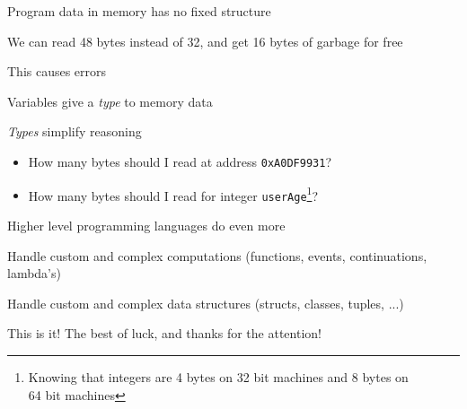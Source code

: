 \documentclass{beamer}
\begin{document}
\begin{slide}{
\item Program data in memory has no fixed structure
\item We can read 48 bytes instead of 32, and get 16 bytes of garbage for free
\item This causes errors
}\end{slide}

\begin{slide}{
\item Variables give a \textit{type} to memory data
\item \textit{Types} simplify reasoning
\pause
\begin{itemize}
\item How many bytes should I read at address \texttt{0xA0DF9931}?
\pause
\item How many bytes should I read for integer \texttt{userAge}\footnote{Knowing that integers are 4 bytes on 32 bit machines and 8 bytes on \\ 64 bit machines}?
\end{itemize}
}\end{slide}

\begin{slide}{
\item Higher level programming languages do even more
\item Handle custom and complex computations (functions, events, continuations, lambda's)
\item Handle custom and complex data structures (structs, classes, tuples, ...)
}\end{slide}



\begin{frame}{This is it!}
\center
\fontsize{18pt}{7.2}\selectfont
The best of luck, and thanks for the attention!
\end{frame}
\end{document}
